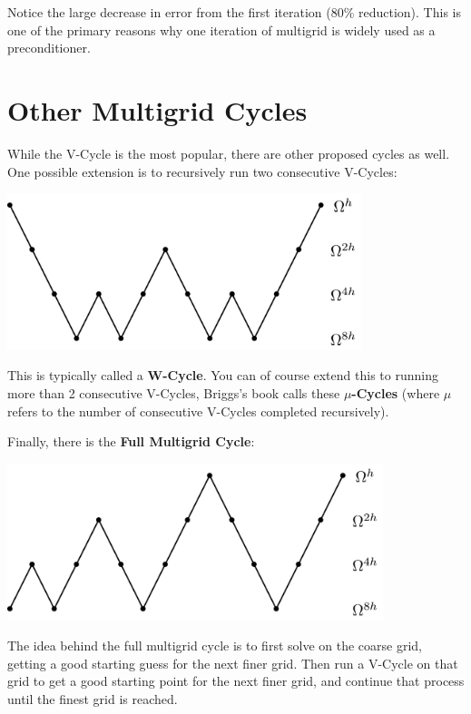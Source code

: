 \documentclass[11pt]{article}
\begin{document}
    Notice the large decrease in error from the first iteration (80\%
reduction). This is one of the primary reasons why one iteration of
multigrid is widely used as a preconditioner.

    \hypertarget{other-multigrid-cycles}{%
\section{Other Multigrid Cycles}\label{other-multigrid-cycles}}

While the V-Cycle is the most popular, there are other proposed cycles
as well. One possible extension is to recursively run two consecutive
V-Cycles:
\begin{center}
  \includegraphics[height=1.8in]{../Graphics/W-Cycle-Graphic.png}
\end{center}
This is typically called a \textbf{W-Cycle}. You can of course extend
this to running more than 2 consecutive V-Cycles, Briggs's book calls
these \textbf{\(\mu\)-Cycles} (where \(\mu\) refers to the number of
consecutive V-Cycles completed recursively).

Finally, there is the \textbf{Full Multigrid Cycle}:
\begin{center}
  \includegraphics[height=1.8in]{../Graphics/FMV-Cycle-Graphic.png}
\end{center}
The idea behind the full multigrid cycle is to first solve on the coarse
grid, getting a good starting guess for the next finer grid. Then run a
V-Cycle on that grid to get a good starting point for the next finer
grid, and continue that process until the finest grid is reached.
\end{document}
